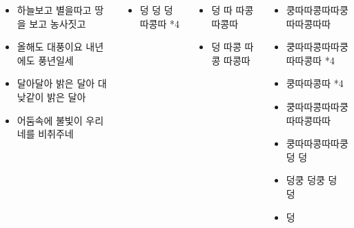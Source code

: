 \documentclass[	20pt, 
							a1paper, 
							portrait, %
							margin=0mm, %
							innermargin=10mm,  		%
							blockverticalspace=4mm, %
							colspace=5mm, 
							subcolspace=0mm
							]{tikzposter}
\begin{document}
\begin{columns}
{\begin{LARGE}
\begin{itemize}
			\item 하늘보고 별을따고 땅을 보고 농사짓고
			\item 올해도 대풍이요 내년에도 풍년일세
			\item 달아달아 밝은 달아 대낮같이 밝은 달아
			\item 어둠속에 불빛이 우리네를 비취주네

			\end{itemize}
			\end{LARGE}
		}


		{
			\setlength{\leftmargini}{2em}			
			\setlength{\labelsep}{1em} 
			\begin{LARGE}
			\begin{itemize}

			\item 덩 덩 덩 따콩따 *4

			\end{itemize}
			\end{LARGE}
		}

		{
			\setlength{\leftmargini}{2em}			
			\setlength{\labelsep}{1em} 
			\begin{LARGE}
			\begin{itemize}

			\item 덩 따 따콩 따콩따
			\item 덩 따콩 따콩 따콩따

			\end{itemize}
			\end{LARGE}
		}


		{
			\setlength{\leftmargini}{2em}			
			\setlength{\labelsep}{1em} 
			\begin{LARGE}
			\begin{itemize}

			\item 쿵따따콩따따쿵따따콩따따 
			\item 쿵따따콩따따쿵따따콩따 *4
			\item 쿵따따콩따 *4
			\item 쿵따따콩따따쿵따따콩따따 
			\item 쿵따따콩따따쿵 덩 덩
			\item 덩쿵 덩쿵 덩 덩
			\item 덩


\end{itemize}
\end{LARGE}}
\end{columns}
\end{document}
